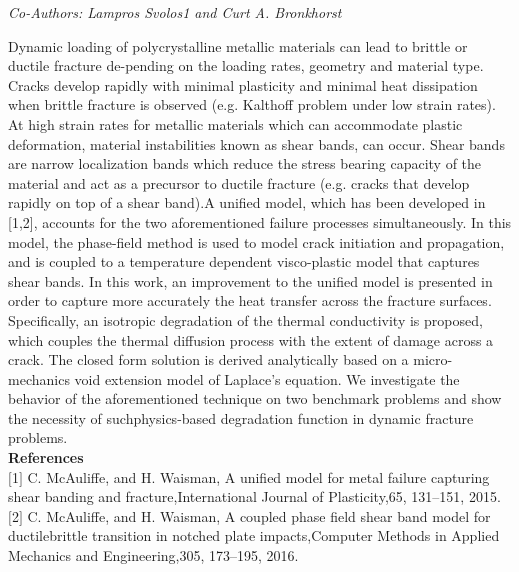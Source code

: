 \begin{center}
\textit{Co-Authors: Lampros Svolos1 and Curt A. Bronkhorst}
\end{center} 
Dynamic loading of polycrystalline metallic materials can lead to brittle or ductile fracture de-pending on the loading rates, geometry and material type. Cracks develop rapidly with minimal plasticity and minimal heat dissipation when brittle fracture is observed (e.g. Kalthoff problem under low strain rates). At high strain rates for metallic materials which can accommodate plastic deformation, material instabilities known as shear bands, can occur. Shear bands are narrow localization bands which reduce the stress bearing capacity of the material and act as a precursor to ductile fracture (e.g. cracks that develop rapidly on top of a shear band).A unified model, which has been developed in [1,2], accounts for the two aforementioned failure processes simultaneously. In this model, the phase-field method is used to model crack initiation and propagation, and is coupled to a temperature dependent visco-plastic model that captures shear bands. In this work, an improvement to the unified model is presented in order to capture more accurately the heat transfer across the fracture surfaces. Specifically, an isotropic degradation of the thermal conductivity is proposed, which couples the thermal diffusion process with the extent of damage across a crack. The closed form solution is derived analytically based on a micro-mechanics void extension model of Laplace’s equation. We investigate the behavior of the aforementioned technique on two benchmark problems and show the necessity of suchphysics-based degradation function in dynamic fracture problems.\\

\noindent\textbf{References}\\
$[$1$]$ C. McAuliffe, and H. Waisman, A unified model for metal failure capturing shear banding and fracture,International Journal of Plasticity,65, 131–151, 2015.\\\newline
$[$2$]$ C. McAuliffe, and H. Waisman, A coupled phase field shear band model for ductilebrittle transition in notched plate impacts,Computer Methods in Applied Mechanics and Engineering,305, 173–195, 2016.
